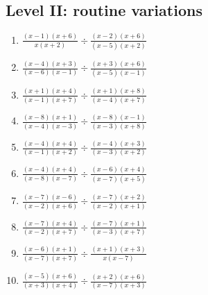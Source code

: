 \documentclass[11pt,oneside]{book}
\begin{document}
\subsection*{Level II: routine variations}
\begin{enumerate}[leftmargin=*,label=\textbf{\arabic*.},itemsep=0.65\baselineskip]
\item $\displaystyle \frac{\left(x - 1\right) \left(x + 6\right)}{x \left(x + 2\right)}\div\frac{\left(x - 2\right) \left(x + 6\right)}{\left(x - 5\right) \left(x + 2\right)}$
\item $\displaystyle \frac{\left(x - 4\right) \left(x + 3\right)}{\left(x - 6\right) \left(x - 1\right)}\div\frac{\left(x + 3\right) \left(x + 6\right)}{\left(x - 5\right) \left(x - 1\right)}$
\item $\displaystyle \frac{\left(x + 1\right) \left(x + 4\right)}{\left(x - 1\right) \left(x + 7\right)}\div\frac{\left(x + 1\right) \left(x + 8\right)}{\left(x - 4\right) \left(x + 7\right)}$
\item $\displaystyle \frac{\left(x - 8\right) \left(x + 1\right)}{\left(x - 4\right) \left(x - 3\right)}\div\frac{\left(x - 8\right) \left(x - 1\right)}{\left(x - 3\right) \left(x + 8\right)}$
\item $\displaystyle \frac{\left(x - 4\right) \left(x + 4\right)}{\left(x - 1\right) \left(x + 2\right)}\div\frac{\left(x - 4\right) \left(x + 3\right)}{\left(x - 3\right) \left(x + 2\right)}$
\item $\displaystyle \frac{\left(x - 4\right) \left(x + 4\right)}{\left(x - 8\right) \left(x - 7\right)}\div\frac{\left(x - 6\right) \left(x + 4\right)}{\left(x - 7\right) \left(x + 5\right)}$
\item $\displaystyle \frac{\left(x - 7\right) \left(x - 6\right)}{\left(x - 2\right) \left(x + 6\right)}\div\frac{\left(x - 7\right) \left(x + 2\right)}{\left(x - 2\right) \left(x + 1\right)}$
\item $\displaystyle \frac{\left(x - 7\right) \left(x + 4\right)}{\left(x - 2\right) \left(x + 7\right)}\div\frac{\left(x - 7\right) \left(x + 1\right)}{\left(x - 3\right) \left(x + 7\right)}$
\item $\displaystyle \frac{\left(x - 6\right) \left(x + 1\right)}{\left(x - 7\right) \left(x + 7\right)}\div\frac{\left(x + 1\right) \left(x + 3\right)}{x \left(x - 7\right)}$
\item $\displaystyle \frac{\left(x - 5\right) \left(x + 6\right)}{\left(x + 3\right) \left(x + 4\right)}\div\frac{\left(x + 2\right) \left(x + 6\right)}{\left(x - 7\right) \left(x + 3\right)}$
\end{enumerate}
\end{document}
